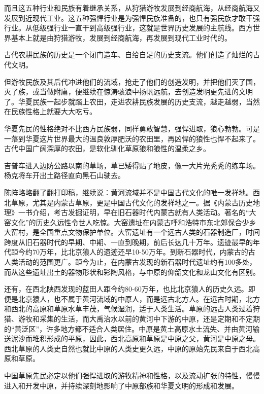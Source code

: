 \par 而且这五种行业和民族有着继承关系，从狩猎游牧发展到经商航海，从经商航海又发展到近现代工业。这五种强悍行业是为强悍民族准备的，也只有强民族才敢干强行业。从低级强行业一直干到高级强行业，这就是世界历史发展的主航线。西方世界基本上就是由狩猎游牧，发展到经商航海，再发展到现代工业时代的。
\par 古代农耕民族的历史是一个闭门造车、自给自足的历史支流。他们创造了灿烂的古代文明。
\par 但游牧民族及其后代冲进他们的流域，抢走了他们的创造发明，并把他们灭了国，灭了族，或当做附庸，便继续在惊涛骇浪中扬帆远航，去创造发明更先进的文明了。华夏民族一起步就踏上农田，走进农耕民族发展的历史支流，越走越弱，当然在民族性格上就要大大吃亏。
\par 华夏先民的性格绝对不比西方民族弱，同样勇敢智慧，强悍进取，狼心勃勃。可是一落到华夏这片世界最大的温良敦厚肥沃的农田里，再凶悍的狼性也悍不起来了。古代中国广阔深厚的农田，是软化驯化草原狼和狼性的温柔之乡。
\par 吉普车进入边防公路以南的草场，草已矮得贴了地皮，像一大片光秃秃的练车场。杨克将车开出土路径直向黑石山驶去。
\par 陈阵略略翻了翻打印稿，继续说：黄河流域并不是中国古代文化的唯一发祥地。西北草原，尤其是内蒙古草原，更是中国古代文化的发祥地之一。据《内蒙古历史地理》一书介绍，考古发掘证明，早在旧石器时代内蒙古就有人类活动。著名的“大窑文化”的历史久远性令世人吃惊。大窑遗址在内蒙古呼和浩特市东北郊保合少乡大窑村，是全国重点文物保护单位。大窑遗址有一个远古人类的石器制造厂，时间跨度从旧石器时代的早期、中期、一直到晚期，前后长达几十万年。遗迹最早的年代距今约70万年，比北京猿人的遗迹还早10-50万年。到新石器时代，内蒙古的古人类活动的范围更广。距今为止，在内蒙古发现的新石器时代遗址约有100多处，而从这些遗址出土的器物形状和彩陶风格，与中原的仰韶文化和龙山文化有区别。
\par 还有，在西北陕西发现的蓝田人距今约80-60万年，也比北京猿人的历史久远。即便是北京猿人，也不属于黄河流域的中原人，而是远古北方人。在远古时期，北方和西北的高原和草原水草丰茂，气候湿润，适于人类生活。草原的远古人类过着狩猎、游牧和采集的生活，而大禹治水以前的黄河中下游的中原，还是定期和不定期的“黄泛区”，许多地方都不适合人类居住。中原是黄土高原水土流失、并由黄河输送泥沙而堆积形成的平原，因此，西北高原和草原是中原之父，黄河是中原之母。西北草原的人类史自然也就比中原的人类史更久远，中原的原始先民来自于西北高原和草原。
\par 中国草原先民必定以他们强悍进取的游牧精神和性格，以及流动扩张的特性，慢慢进入和开发中原，并持续深刻地影响了中原部族和华夏文明的形成和发展。
